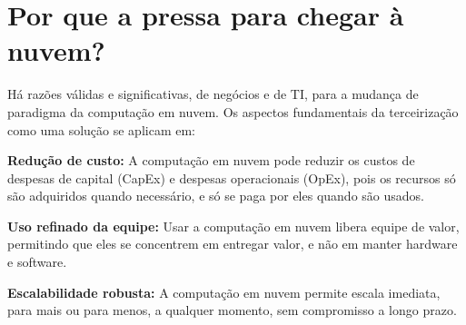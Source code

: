 \section{Por que a pressa para chegar à nuvem?}

Há razões válidas e significativas, de negócios e de TI, para a mudança de
paradigma da computação em nuvem. Os aspectos fundamentais da terceirização como
uma solução se aplicam em: 

\newcommand{\itemm}[1]{\item\textbf{#1}}

\begin{itemise}
    \itemm{Redução de custo:} A computação em nuvem pode reduzir os custos de
        despesas de capital (CapEx) e despesas operacionais (OpEx), pois os recursos
        só são adquiridos quando necessário, e só se paga por eles quando são usados.

    \itemm{Uso refinado da equipe:} Usar a computação em nuvem libera equipe de
        valor, permitindo que eles se concentrem em entregar valor, e não em manter
        hardware e software.

    \itemm {Escalabilidade robusta:} A computação em nuvem permite escala imediata,
        para mais ou para menos, a qualquer momento, sem compromisso a longo prazo.
\end{itemise}

\undef\itemm
